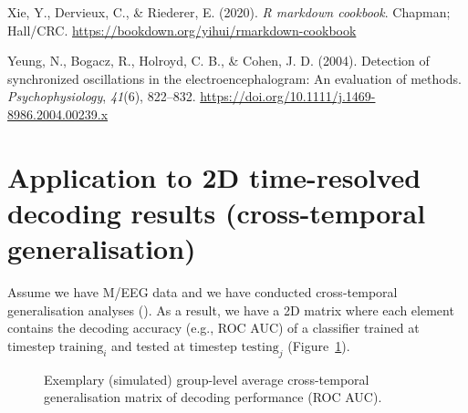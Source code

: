 \documentclass[
  doc,
  floatsintext,
  longtable,
  a4paper,
  nolmodern,
  notxfonts,
  notimes,
  colorlinks=true,linkcolor=blue,citecolor=blue,urlcolor=blue]{apa7}
\newlength{\cslhangindent}
\newenvironment{CSLReferences}[2] %
 {\begin{list}{}{%
  \setlength{\itemindent}{0pt}
  \setlength{\leftmargin}{0pt}
  \setlength{\parsep}{0pt}
  \ifodd #1
   \setlength{\leftmargin}{\cslhangindent}
   \setlength{\itemindent}{-1\cslhangindent}
  \fi
  \setlength{\itemsep}{#2\baselineskip}}}
 {\end{list}}
\begin{document}
\begin{CSLReferences}{1}{0}
Xie, Y., Dervieux, C., \& Riederer, E. (2020). \emph{R markdown
cookbook}. Chapman; Hall/CRC.
\url{https://bookdown.org/yihui/rmarkdown-cookbook}

Yeung, N., Bogacz, R., Holroyd, C. B., \& Cohen, J. D. (2004). Detection
of synchronized oscillations in the electroencephalogram: An evaluation
of methods. \emph{Psychophysiology}, \emph{41}(6), 822--832.
\url{https://doi.org/10.1111/j.1469-8986.2004.00239.x}

\end{CSLReferences}

\newpage

\appendix

\section{Application to 2D time-resolved decoding results
(cross-temporal
generalisation)}\label{application-to-2d-time-resolved-decoding-results-cross-temporal-generalisation}

Assume we have M/EEG data and we have conducted cross-temporal
generalisation analyses (). As a result, we have a 2D matrix where each element contains the
decoding accuracy (e.g., ROC AUC) of a classifier trained at timestep
\(\text{training}_{i}\) and tested at timestep \(\text{testing}_{j}\)
(Figure~\ref{fig-sim-timegen}).

\begin{figure}[!htb]

\caption{\label{fig-sim-timegen}Exemplary (simulated) group-level
average cross-temporal generalisation matrix of decoding performance
(ROC AUC).}


\end{figure}%
\end{document}

